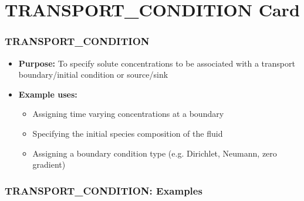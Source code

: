 \section{TRANSPORT\_CONDITION Card}

\begin{frame}\frametitle{TRANSPORT\_CONDITION}

\begin{itemize}
\item[] \textbf{Purpose:} To specify solute concentrations to be associated with a transport boundary/initial condition or source/sink
\item[] \textbf{Example uses:}
\begin{itemize}
  \item Assigning time varying concentrations at a boundary
  \item Specifying the initial species composition of the fluid
  \item Assigning a boundary condition type (e.g. Dirichlet, Neumann, zero gradient)
\end{itemize}
\end{itemize}

\end{frame}

\begin{frame}[fragile]\frametitle{TRANSPORT\_CONDITION: Examples}

\end{frame}
